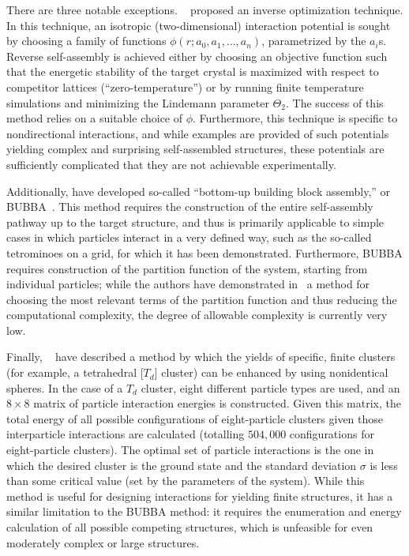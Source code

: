 There are three notable exceptions.  \citeauthor{torquato}~\cite{torquato} proposed an inverse optimization technique.
In this technique, an isotropic (two-dimensional) interaction potential is sought by choosing a family of functions $\phi(r; a_0, a_1, ..., a_n)$, parametrized by the $a_i$s.
Reverse self-assembly is achieved either by choosing an objective function such that the energetic stability of the target crystal is maximized with respect to competitor lattices (``zero-temperature'') or by running finite temperature simulations and minimizing the Lindemann parameter $\Theta_2$.
The success of this method relies on a suitable choice of $\phi$.
Furthermore, this technique is specific to nondirectional interactions, and while examples are provided of such potentials yielding complex and surprising self-assembled structures, these potentials are sufficiently complicated that they are not achievable experimentally.

Additionally, \citeauthor{glotzer7} have developed so-called ``bottom-up building block assembly,'' or BUBBA~\cite{glotzer7,glotzer8}.
This method requires the construction of the entire self-assembly pathway up to the target structure, and thus is primarily applicable to simple cases in which particles interact in a very defined way, such as the so-called tetrominoes on a grid, for which it has been demonstrated.
Furthermore, BUBBA requires construction of the partition function of the system, starting from individual particles; while the authors have demonstrated in~\cite{glotzer8} a method for choosing the most relevant terms of the partition function and thus reducing the computational complexity, the degree of allowable complexity is currently very low.

Finally, \citeauthor{brenner}~\cite{brenner} have described a method by which the yields of specific, finite clusters (for example, a tetrahedral [$T_d$] cluster) can be enhanced by using nonidentical spheres.
In the case of a $T_d$ cluster, eight different particle types are used, and an $8 \times 8$ matrix of particle interaction energies is constructed. 
Given this matrix, the total energy of all possible configurations of eight-particle clusters given those interparticle interactions are calculated (totalling $504,000$ configurations for eight-particle clusters).
The optimal set of particle interactions is the one in which the desired cluster is the ground state and the standard deviation $\sigma$ is less than some critical value (set by the parameters of the system).
While this method is useful for designing interactions for yielding finite structures, it has a similar limitation to the BUBBA method: it requires the enumeration and energy calculation of all possible competing structures, which is unfeasible for even moderately complex or large structures.

